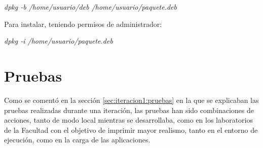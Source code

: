 \begin{center}
    \emph{dpkg -b /home/usuario/deb /home/usuario/paquete.deb}
\end{center}

Para instalar, teniendo permisos de administrador:

\begin{center}
    \emph{dpkg -i /home/usuario/paquete.deb}
\end{center}




\section{Pruebas}
\label{sec:despliegue:pruebas}

Como se comentó en la sección \ref{sec:iteracion1:pruebas} en la que se explicaban las pruebas realizadas durante una iteración, las pruebas han sido combinaciones de acciones, tanto de modo local mientras se desarrollaba, como en los laboratorios de la Facultad con el objetivo de imprimir mayor realismo, tanto en el entorno de ejecución, como en la carga de las aplicaciones.
\newline



